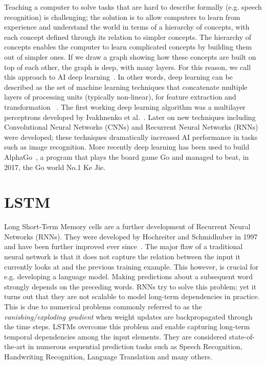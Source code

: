 Teaching a computer to solve tasks that are hard to describe formally (e.g. speech recognition) is challenging; the solution is to allow computers to learn from experience and understand the world in terms of a hierarchy of concepts, with each concept defined through its relation to simpler concepts. The hierarchy of concepts enables the computer to learn complicated concepts by building them out of simpler ones. If we draw a graph showing how these concepts are built on top of each other, the graph is deep, with many layers. For this reason, we call this approach to AI deep learning~\cite{Goodfellow-et-al-2016}. In other words, deep learning can be described as the set of machine learning techniques that concatenate multiple layers of processing units (typically non-linear), for feature extraction and transformation  ~\cite{deep_learning_heterogeneus}. The first working deep learning algorithm was a multilayer perceptrons developed by Ivakhnenko et al.~\cite{ivakhnenko1973cybernetic}. Later on new techniques including Convolutional Neural Networks (CNNs) and Recurrent Neural Networks (RNNs) were developed; these techniques dramatically increased AI performance in tasks such as image recognition. More recently deep learning has been used to build AlphaGo~\cite{alphago}, a program that plays the board game Go and managed to beat, in 2017, the Go world No.1 Ke Jie.

\section{LSTM}
Long Short-Term Memory cells are a further development of Recurrent Neural Networks (RNNs). They were developed by Hochreiter and Schmidhuber in 1997 and have been further improved ever since~\cite{Greff2016}. The major flaw of a traditional neural network is that it does not capture the relation between the input it currently looks at and the previous training example. This however, is crucial for e.g. developing a language model. Making predictions about a subsequent word strongly depends on the preceding words. RNNs try to solve this problem; yet it turns out that they are not scalable to model long-term dependencies in practice. This is due to numerical problems commonly referred to as the \textit{vanishing/exploding gradient} when weight updates are backpropagated through the time steps. LSTMs overcome this problem and enable capturing long-term temporal dependencies among the input elements. They are considered state-of-the-art in numerous sequential prediction tasks such as Speech Recognition, Handwriting Recognition, Language Translation and many others.

